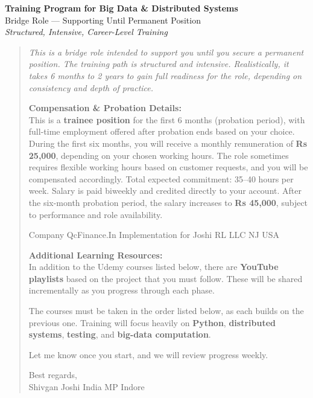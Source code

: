 \documentclass[12pt]{article}
\begin{document}
	
	\begin{center}
		{\Huge\bfseries Training Program for Big Data \& Distributed Systems} \\[0.5cm]
		{\large Bridge Role — Supporting Until Permanent Position} \\[0.3cm]
		{\textit{Structured, Intensive, Career-Level Training}} \\[1cm]
	\end{center}
	
	\begin{quote}
		\emph{This is a bridge role intended to support you until you secure a permanent position. The training path is structured and intensive. Realistically, it takes 6 months to 2 years to gain full readiness for the role, depending on consistency and depth of practice.}
		
		\vspace{0.3cm}
		
		\textbf{Compensation \& Probation Details:} \\
		This is a \textbf{trainee position} for the first 6 months (probation period), with full-time employment offered after probation ends based on your choice. During the first six months, you will receive a monthly remuneration of \textbf{Rs 25,000}, depending on your chosen working hours. The role sometimes requires flexible working hours based on customer requests, and you will be compensated accordingly. Total expected commitment: 35–40 hours per week. Salary is paid biweekly and credited directly to your account. After the six-month probation period, the salary increases to \textbf{Rs 45,000}, subject to performance and role availability.
		
		Company QcFinance.In
		Implementation for Joshi RL LLC NJ USA
		
		\vspace{0.3cm}
		
		\textbf{Additional Learning Resources:} \\
		In addition to the Udemy courses listed below, there are \textbf{YouTube playlists} based on the project that you must follow. These will be shared incrementally as you progress through each phase.
		
		\vspace{0.3cm}
		
		The courses must be taken in the order listed below, as each builds on the previous one. Training will focus heavily on \textbf{Python}, \textbf{distributed systems}, \textbf{testing}, and \textbf{big-data computation}.
		
		Let me know once you start, and we will review progress weekly.
		
		Best regards, \\
		Shivgan Joshi India MP Indore
	\end{quote}
	
\end{document}
